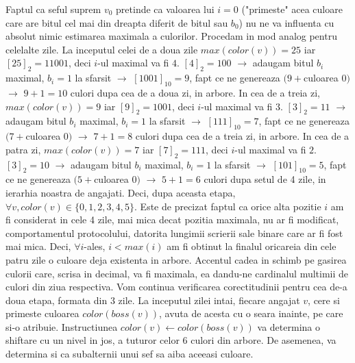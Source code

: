 \documentclass{article}
\begin{document}
\newline
\newline
Faptul ca seful suprem $v_0$ pretinde ca valoarea lui $i=0$ ("primeste" acea culoare care are bitul cel mai din dreapta diferit de bitul sau $b_0$) nu ne va influenta cu absolut nimic estimarea maximala a culorilor.
\newline
\newline
Procedam in mod analog pentru celelalte zile. La inceputul celei de a doua zile $max(color(v))=25$ iar $[25]_2=11001$, deci $i$-ul maximal va fi $4$. $[4]_2=100$ $\rightarrow$ adaugam bitul $b_i$ maximal, $b_i=1$ la sfarsit $\rightarrow$ $[1001]_{10}=9$, fapt ce ne genereaza $(9+$culoarea $0)$ $\rightarrow$ $9+1=10$ culori dupa cea de a doua zi, in arbore.
\newline
\newline
In cea de a treia zi, $max(color(v))=9$ iar $[9]_2=1001$, deci $i$-ul maximal va fi $3$. $[3]_2=11$ $\rightarrow$ adaugam bitul $b_i$ maximal, $b_i=1$ la sfarsit $\rightarrow$ $[111]_{10}=7$, fapt ce ne genereaza $(7+$culoarea $0)$ $\rightarrow$ $7+1=8$ culori dupa cea de a treia zi, in arbore.
\newline
\newline
In cea de a patra zi, $max(color(v))=7$ iar $[7]_2=111$, deci $i$-ul maximal va fi $2$. $[3]_2=10$ $\rightarrow$ adaugam bitul $b_i$ maximal, $b_i=1$ la sfarsit $\rightarrow$ $[101]_{10}=5$, fapt ce ne genereaza $(5+$culoarea $0)$ $\rightarrow$ $5+1=6$ culori dupa setul de 4 zile, in ierarhia noastra de angajati. Deci, dupa aceasta etapa, $\forall v, color(v) \in \{0,1,2,3,4,5\}$.
\newline
\newline
Este de precizat faptul ca orice alta pozitie $i$ am fi considerat in cele 4 zile, mai mica decat pozitia maximala, nu ar fi modificat, comportamentul protocolului, datorita lungimii scrierii sale binare care ar fi fost mai mica. Deci, $\forall i $-ales, $i<max(i)$ am fi obtinut la finalul oricareia din cele patru zile o culoare deja existenta in arbore. Accentul cadea in schimb pe gasirea culorii care, scrisa in decimal, va fi maximala, ea dandu-ne cardinalul multimii de culori din ziua respectiva.
\newline
\newline
Vom continua verificarea corectitudinii pentru cea de-a doua etapa, formata din 3 zile.
\newline
\newline
La inceputul zilei intai, fiecare angajat $v$, cere si primeste culoarea $color(boss(v))$, avuta de acesta cu o seara inainte, pe care si-o atribuie. Instructiunea $color(v) \leftarrow color(boss(v))$ va determina o shiftare cu un nivel in jos, a tuturor celor 6 culori din arbore. De asemenea, va determina si ca subalternii unui sef sa aiba aceeasi culoare. 
\end{document}
